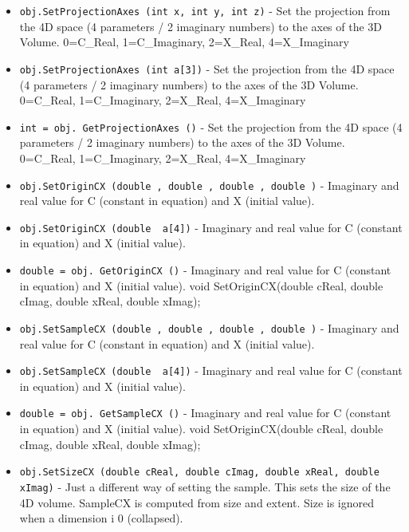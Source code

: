 \begin{itemize}
\item  \verb|obj.SetProjectionAxes (int x, int y, int z)| -  Set the projection from  the 4D space (4 parameters / 2 imaginary numbers)
 to the axes of the 3D Volume. 
 0=C\_Real, 1=C\_Imaginary, 2=X\_Real, 4=X\_Imaginary

\item  \verb|obj.SetProjectionAxes (int a[3])| -  Set the projection from  the 4D space (4 parameters / 2 imaginary numbers)
 to the axes of the 3D Volume. 
 0=C\_Real, 1=C\_Imaginary, 2=X\_Real, 4=X\_Imaginary

\item  \verb|int = obj. GetProjectionAxes ()| -  Set the projection from  the 4D space (4 parameters / 2 imaginary numbers)
 to the axes of the 3D Volume. 
 0=C\_Real, 1=C\_Imaginary, 2=X\_Real, 4=X\_Imaginary

\item  \verb|obj.SetOriginCX (double , double , double , double )| -  Imaginary and real value for C (constant in equation) 
 and X (initial value).

\item  \verb|obj.SetOriginCX (double  a[4])| -  Imaginary and real value for C (constant in equation) 
 and X (initial value).

\item  \verb|double = obj. GetOriginCX ()| -  Imaginary and real value for C (constant in equation) 
 and X (initial value).
void SetOriginCX(double cReal, double cImag, double xReal, double xImag);

\item  \verb|obj.SetSampleCX (double , double , double , double )| -  Imaginary and real value for C (constant in equation) 
 and X (initial value).

\item  \verb|obj.SetSampleCX (double  a[4])| -  Imaginary and real value for C (constant in equation) 
 and X (initial value).

\item  \verb|double = obj. GetSampleCX ()| -  Imaginary and real value for C (constant in equation) 
 and X (initial value).
void SetOriginCX(double cReal, double cImag, double xReal, double xImag);

\item  \verb|obj.SetSizeCX (double cReal, double cImag, double xReal, double xImag)| -  Just a different way of setting the sample.  
 This sets the size of the 4D volume. 
 SampleCX is computed from size and extent.
 Size is ignored when a dimension i 0 (collapsed).


\end{itemize}
